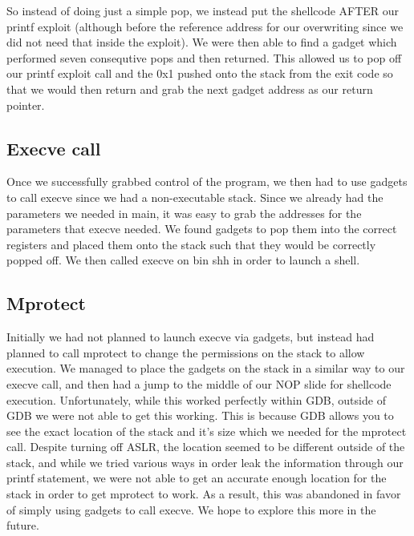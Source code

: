 So instead of doing just a simple pop, we instead put the shellcode AFTER our printf exploit (although before the reference address for our overwriting since we did not need that inside the exploit). We were then able to find a gadget which performed seven consequtive pops and then returned. This allowed us to pop off our printf exploit call and the 0x1 pushed onto the stack from the exit code so that we would then return and grab the next gadget address as our return pointer. 

\subsection{Execve call}
Once we successfully grabbed control of the program, we then had to use gadgets to call execve since we had a non-executable stack. Since we already had the parameters we needed in main, it was easy to grab the addresses for the parameters that execve needed. We found gadgets to pop them into the correct registers and placed them onto the stack such that they would be correctly popped off. We then called execve on bin shh in order to launch a shell.

\subsection{Mprotect}
Initially we had not planned to launch execve via gadgets, but instead had planned to call mprotect to change the permissions on the stack to allow execution. We managed to place the gadgets on the stack in a similar way to our execve call, and then had a jump to the middle of our NOP slide for shellcode execution. Unfortunately, while this worked perfectly within GDB, outside of GDB we were not able to get this working. This is because GDB allows you to see the exact location of the stack and it's size which we needed for the mprotect call. Despite turning off ASLR, the location seemed to be different outside of the stack, and while we tried various ways in order leak the information through our printf statement, we were not able to get an accurate enough location for the stack in order to get mprotect to work. As a result, this was abandoned in favor of simply using gadgets to call execve. We hope to explore this more in the future. 



